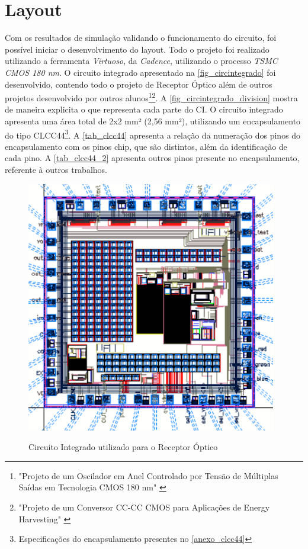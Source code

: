 \section{Layout}

Com os resultados de simulação validando o funcionamento do circuito, foi possível iniciar o desenvolvimento do layout. Todo o projeto foi realizado utilizando a ferramenta \textit{Virtuoso}, da \textit{Cadence}, utilizando o processo \textit{TSMC CMOS 180 nm}. O circuito integrado apresentado na \autoref{fig_circintegrado} foi desenvolvido, contendo todo o projeto de Receptor Óptico além de outros projetos desenvolvido por outros alunos\footnote{"Projeto de um Oscilador em Anel Controlado por Tensão de Múltiplas Saídas em Tecnologia CMOS 180 nm" \cite{VictorRodrigues}}\footnote{"Projeto de um Conversor CC-CC CMOS para Aplicações de Energy Harvesting" \cite{LucasChaves}}. A \autoref{fig_circintegrado_division} mostra de maneira explicita o que representa cada parte do CI. O circuito integrado apresenta uma área total de 2x2 mm² (2,56 mm²), utilizando um encapsulamento do tipo CLCC44\footnote{Especificações do encapsulamento presentes no \autoref{anexo_clcc44}}. A \autoref{tab_clcc44} apresenta a relação da numeração dos pinos do encapsulamento com os pinos chip, que são distintos, além da identificação de cada pino. A \autoref{tab_clcc44_2} apresenta outros pinos presente no encapsulamento, referente à outros trabalhos.

\begin{figure}[htb]
 \centering
    \caption{Circuito Integrado utilizado para o Receptor Óptico} 
    \includegraphics[scale=0.5]{Resultados/Imagens/CircuitoIntegrado.png}
    \label{fig_circintegrado}
\end{figure}

